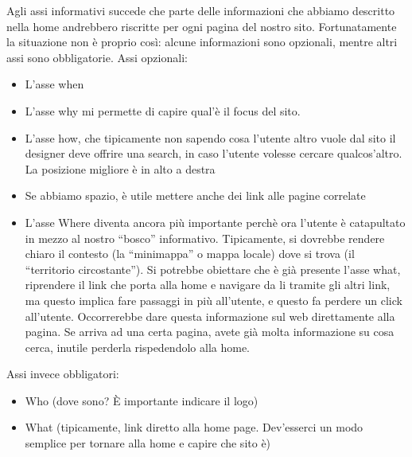 Agli assi informativi succede che parte delle informazioni che abbiamo descritto nella home andrebbero riscritte per ogni pagina del nostro sito. Fortunatamente la situazione non \`e proprio cos\`i: alcune informazioni sono opzionali, mentre altri assi sono obbligatorie. Assi opzionali:
\begin{itemize}

\item L'asse when

\item L'asse why mi permette di capire qual'\`e il focus del sito.

\item L'asse how, che tipicamente non sapendo cosa l'utente altro vuole dal sito il designer deve offrire una search, in caso l'utente volesse cercare qualcos'altro. La posizione migliore \`e in alto a destra

\item Se abbiamo spazio, \`e utile mettere anche dei link alle pagine correlate

\item L'asse Where diventa ancora pi\`u importante perch\`e ora l'utente \`e catapultato in mezzo al nostro ``bosco'' informativo. Tipicamente, si dovrebbe rendere chiaro il contesto (la ``minimappa'' o mappa locale) dove si trova (il ``territorio circostante''). Si potrebbe obiettare che \`e gi\`a presente l'asse what, riprendere il link che porta alla home e navigare da li tramite gli altri link, ma questo implica fare passaggi in pi\`u all'utente, e questo fa perdere un click all'utente. Occorrerebbe dare questa informazione sul web direttamente alla pagina. Se arriva ad una certa pagina, avete gi\`a molta informazione su cosa cerca, inutile perderla rispedendolo alla home.

\end{itemize}

Assi invece obbligatori:

\begin{itemize}

\item Who (dove sono? \`E importante indicare il logo)

\item What (tipicamente, link diretto alla home page. Dev'esserci un modo semplice per tornare alla home e capire che sito \`e)

\end{itemize}

